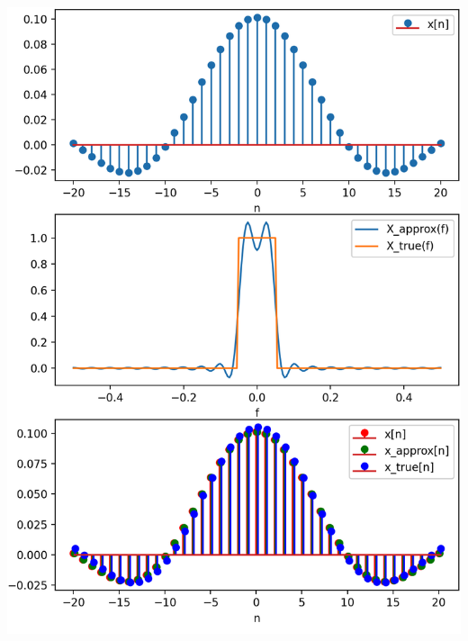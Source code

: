 \begin{listing}[ht]
    \noindent
    \begin{minipage}{0.51\textwidth}
        \strut\vspace*{-\baselineskip}\newline
        \inputminted[firstline=5, lastline=48]{python3}{code/dtft.py}
    \end{minipage}%
    \begin{minipage}{0.48\textwidth}
        \strut\vspace*{-\baselineskip}\newline
        \includegraphics[width=\textwidth]{code/dtft.png}
    \end{minipage}
    \label{py:dtft}
\end{listing}
%
\FloatBarrier
